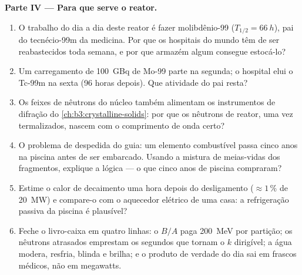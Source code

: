 \begin{problem}
\medskip\noindent\textbf{Parte IV --- Para que serve o reator.}

\begin{enumerate}[resume]
  \item O trabalho do dia a dia deste reator é fazer molibdênio-99
        ($T_{1/2} = \qty{66}{h}$), pai do tecnécio-99m da
        medicina. Por que os hospitais do mundo têm de ser
        reabastecidos toda semana, e por que armazém algum consegue estocá-lo?
  \item Um carregamento de \qty{100}{GBq} de Mo-99 parte na segunda; o
        hospital elui o Tc-99m na sexta (96 horas depois). Que
        atividade do pai resta?
  \item Os feixes de nêutrons do núcleo também alimentam os
        instrumentos de difração do \cref{ch:b3:crystalline-solids}: por que
        os nêutrons de reator, uma vez termalizados, nascem com o
        comprimento de onda certo?
  \item O problema de despedida do guia: um elemento combustível passa
        cinco anos na piscina antes de ser embarcado. Usando a
        mistura de meias-vidas dos fragmentos, explique a lógica --- o que
        cinco anos de piscina compraram?
  \item Estime o calor de decaimento uma hora depois do desligamento
        ($\approx1\,\%$ de \qty{20}{MW}) e compare-o com o
        aquecedor elétrico de uma casa: a refrigeração passiva da piscina
        é plausível?
  \item Feche o livro-caixa em quatro linhas: o $B/A$ paga
        \qty{200}{MeV} por partição; os nêutrons atrasados emprestam os
        segundos que tornam o $k$ dirigível; a água modera,
        resfria, blinda e brilha; e o produto de verdade do dia
        sai em frascos médicos, não em megawatts.
\end{enumerate}
\end{problem}
